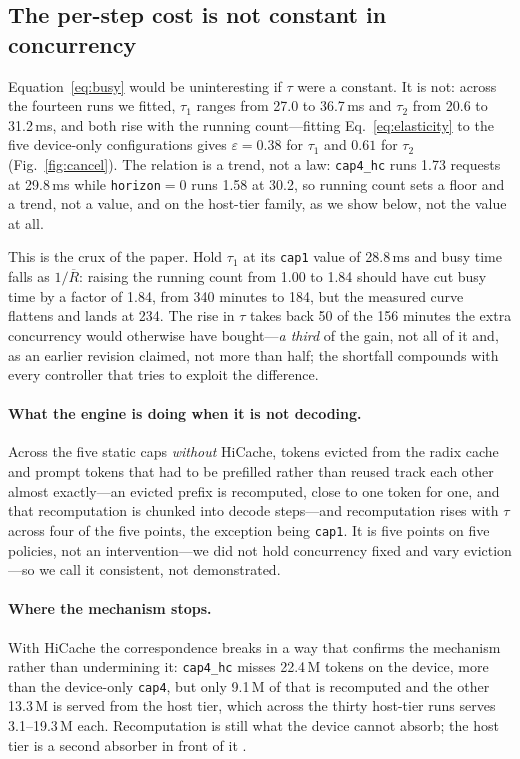 \subsection{The per-step cost is not constant in concurrency}

Equation~\ref{eq:busy} would be uninteresting if $\tau$ were a constant. It is not:
across the fourteen runs we fitted, $\tau_1$ ranges from 27.0 to 36.7\,ms and
$\tau_2$ from 20.6 to 31.2\,ms, and both rise with the running count---fitting
Eq.~\ref{eq:elasticity} to the five device-only configurations gives
$\varepsilon = 0.38$ for $\tau_1$ and $0.61$ for $\tau_2$ (Fig.~\ref{fig:cancel}).
The relation is a trend, not a law:
\texttt{cap4\_hc} runs 1.73 requests at 29.8\,ms while \texttt{horizon}$=0$ runs
1.58 at 30.2, so running count sets a floor and a trend, not a value, and on the
host-tier family, as we show below, not the value at all.

This is the crux of the paper. Hold $\tau_1$ at its \texttt{cap1} value of
28.8\,ms and busy time falls as $1/\overline{R}$: raising the running count from
1.00 to 1.84 should have cut busy time by a factor of 1.84, from 340 minutes to
184, but the measured curve flattens and lands at 234. The rise in $\tau$ takes
back 50 of the 156 minutes the extra concurrency would otherwise have
bought---\emph{a third} of the gain, not all of it and, as an earlier revision
claimed, not more than half; the shortfall compounds with every controller that
tries to exploit the difference.

\paragraph{What the engine is doing when it is not decoding.} Across the five
static caps \emph{without} HiCache, tokens evicted from the radix cache
\cite{h2o,scissorhands} and prompt
tokens that had to be prefilled rather than reused track each other almost
exactly---an evicted prefix is recomputed, close to one token for one, and that
recomputation is chunked into decode steps---and recomputation rises with $\tau$
across four of the five points, the exception being \texttt{cap1}. It is five
points on
five policies, not an intervention---we did not hold concurrency fixed and vary
eviction---so we call it consistent, not demonstrated.

\paragraph{Where the mechanism stops.} With HiCache the correspondence breaks in a
way that confirms the mechanism rather than undermining it: \texttt{cap4\_hc}
misses 22.4\,M tokens on the device, more than the device-only \texttt{cap4}, but
only 9.1\,M of that is recomputed and the other 13.3\,M is served from the host
tier, which across the thirty host-tier runs serves 3.1--19.3\,M each.
Recomputation is still what the device cannot absorb; the host tier is a second
absorber in front of it \cite{gao2024cachedattention}.

